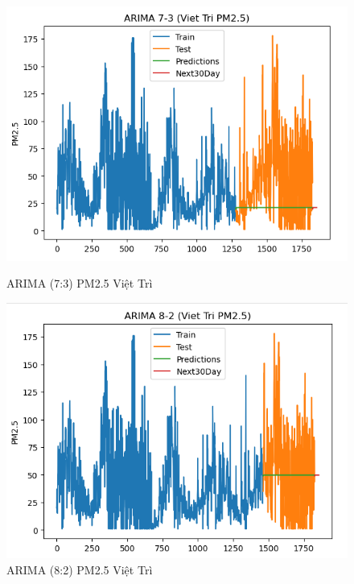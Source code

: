 \begin{figure}[h]
\begin{minipage}[b]{0.45\linewidth}
        \includegraphics[width=\linewidth]{img/ARIMA_7_3_VT.png}
        \caption{\scriptsize ARIMA (7:3) PM2.5  Việt Trì}
        \label{fig1}
    \end{minipage}\hfill
    \begin{minipage}[b]{0.45\linewidth}
        \centering
        \includegraphics[width=\linewidth]{img/ARIMA_8_2_VT.png}
        \caption{\scriptsize ARIMA (8:2) PM2.5 Việt Trì}
        \label{fig2}
    \end{minipage}
    \begin{minipage}[b]{0.45\linewidth}
        \centering

\end{minipage}
\end{figure}
